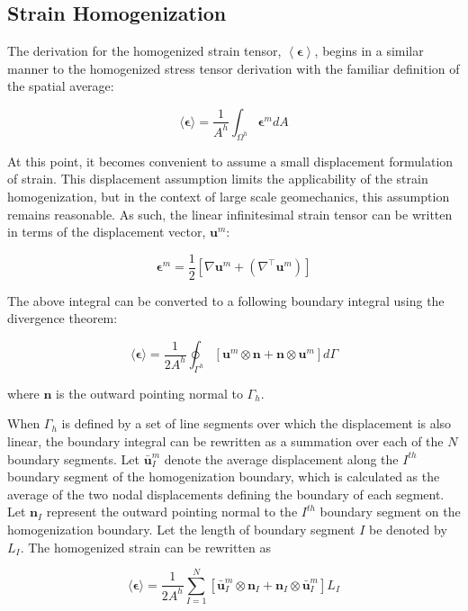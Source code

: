 \subsection{Strain Homogenization}

The derivation for the homogenized strain tensor, $\left< \boldsymbol{\epsilon}\right>$, begins in a similar manner to the homogenized stress tensor derivation with the familiar definition of the spatial average:

\begin{equation}
\langle\boldsymbol{\epsilon}\rangle=\frac{1}{A^{h}}\int_{\Omega^{h}}\boldsymbol{\epsilon}^m dA\label{eqn:strain2}
\end{equation}

At this point, it becomes convenient to assume a small displacement formulation of strain. This displacement assumption limits the applicability of the strain homogenization, but in the context of large scale geomechanics, this assumption remains reasonable. As such, the linear infinitesimal strain tensor can be written in terms of the displacement vector, $\mathbf{u}^m$:

\begin{equation}
\boldsymbol{\epsilon}^m=\frac{1}{2}\left[\nabla\mathbf{u}^m+\left(\nabla^\top \mathbf{u}^m\right)\right]\label{eqn:strain1}
\end{equation}

The above integral can be converted to a following boundary integral using the divergence theorem:

\begin{equation}
\langle\boldsymbol{\epsilon}\rangle=\frac{1}{2A^{h}}\oint_{\Gamma^{h}}\left[\mathbf{u}^m\otimes\mathbf{n}+\mathbf{n}\otimes\mathbf{u}^m\right]d\Gamma\label{eqn:strain5-1}
\end{equation}

where $\mathbf{n}$ is the outward pointing normal to $\Gamma_h$.

When $\Gamma_h$ is defined by a set of line segments over which the displacement is also linear, the boundary integral can be rewritten as a summation over each of the $N$ boundary segments. Let $\bar{\mathbf{u}}^m_{I}$ denote the average displacement along the $I^{th}$ boundary segment of the homogenization boundary, which is calculated as the average of the two nodal displacements defining the boundary of each segment. Let $\mathbf{n}_{I}$ represent the outward pointing normal to the $I^{th}$ boundary segment on the homogenization boundary.  Let the length of boundary segment $I$ be denoted by $L_{I}$. The homogenized strain can be rewritten as

\begin{equation}
\langle\boldsymbol{\epsilon}\rangle=\frac{1}{2A^{h}}\sum_{I=1}^{N}\left[\bar{\mathbf{u}}^m_{I}\otimes\mathbf{n}_{I}+\mathbf{n}_{I}\otimes\bar{\mathbf{u}}^m_{I}\right]L_{I}\label{eqn:strain7}
\end{equation}
